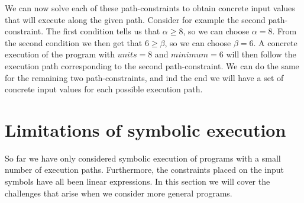 		\noindent We can now solve each of these path-constraints to obtain concrete input values that will execute along the given path.
		Consider for example the second path-constraint. The first condition tells us that $\alpha \geq 8$, so we can choose $\alpha = 8$. From the second condition we then get that $6  \geq \beta$, so we can choose $\beta = 6$. A concrete execution of the program with $units = 8$ and $minimum = 6$ will then follow the execution path corresponding to the second path-constraint. We can do the same for the remaining two path-constraints, and ind the end we will have a set of concrete input values for each possible execution path. 
	
\iffalse		
\section{Constraint solving}
	As we just described, a symbolic execution of a program results in one or more \emph{path-constraints} corresponding to each possible execution path. We know that each of these \emph{path-constraints} are satisfiable, so we can solve the \pc by finding an assignment of concrete values to the symbols, that causes it to evaluate to true. Consider for example 
	
	\begin{equation*}
		true \land (\alpha \cdot 2 \geq 16) \land (2\cdot \alpha - 10 \geq \beta)
	\end{equation*}
	
	which is one of the three resulting \emph{path-constraints} from the motivating example. From the first condition we get that $\alpha \geq 8$, so we can choose $\alpha = 8$. The second condition then gives us that $6 \geq \beta$, so we can choose $\beta = 6$. If we do a concrete execution of the program with $units = 8$ and $minimum = 6$, it will follow the execution path that correspond to this \pc. We can do the same for the remaining two \emph{path-constraints}, and in the end we will have a pair of concrete input values for each possible execution path. So symbolic execution not only allows us to explore all possible execution paths, it also allows to generate a small set of concrete input values that cover all these paths.  

\fi
\section{Limitations of symbolic execution}
	So far we have only considered symbolic execution of programs with a small number of execution paths. Furthermore, the constraints placed on the input symbols have all been linear expressions.
	In this section we will cover the challenges that arise when we consider more general programs.
	
